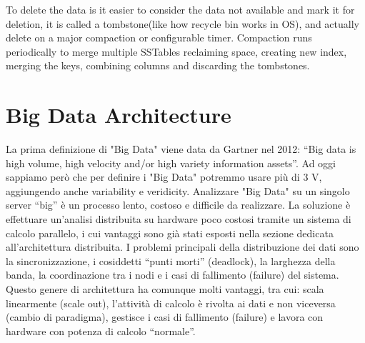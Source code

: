 \documentclass[a4page, 11pt]{article}
\begin{document}
To delete the data is it easier to consider the data not available and mark it for deletion, it is called a tombstone(like how recycle bin works in OS), and actually delete on a major compaction or configurable timer.\newline
Compaction runs periodically to merge multiple SSTables reclaiming space, creating new index, merging the keys, combining columns and discarding the tombstones.
\section{Big Data Architecture}
La prima definizione di "Big Data" viene data da Gartner nel 2012: “Big data is high volume, high velocity and/or high variety information assets”. Ad oggi sappiamo però che per definire i "Big Data" potremmo usare più di 3 V, aggiungendo anche variability e veridicity. Analizzare "Big Data" su un singolo server “big” è un processo lento, costoso e difficile da realizzare. La soluzione è effettuare un’analisi distribuita su hardware poco costosi tramite un sistema di calcolo parallelo, i cui vantaggi sono già stati esposti nella sezione dedicata all'architettura distribuita. I problemi principali della distribuzione dei dati sono la sincronizzazione, i cosiddetti “punti morti” (deadlock), la larghezza della banda, la coordinazione tra i nodi e i casi di fallimento (failure) del sistema. Questo genere di architettura ha comunque molti vantaggi, tra cui: scala linearmente (scale out), l’attività di calcolo è rivolta ai dati e non viceversa (cambio di paradigma), gestisce i casi di fallimento (failure) e lavora con hardware con potenza di calcolo “normale”.
\end{document}
